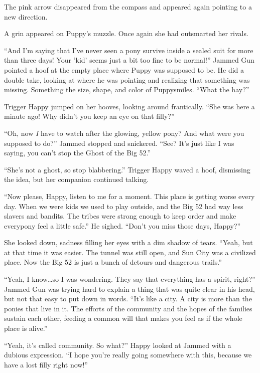 The pink arrow disappeared from the compass and appeared again pointing to a new direction.

A grin appeared on Puppy's muzzle. Once again she had outsmarted her rivals.


\horizonline


``And I'm saying that I've never seen a pony survive inside a sealed suit for more than three days! Your 'kid' seems just a bit too fine to be normal!'' Jammed Gun pointed a hoof at the empty place where Puppy was supposed to be. He did a double take, looking at where he was pointing and realizing that something was missing. Something the size, shape, and color of Puppysmiles. ``What the hay?''

Trigger Happy jumped on her hooves, looking around frantically. ``She was here a minute ago! Why didn't you keep an eye on that filly?''

``Oh, now \emph{I} have to watch after the glowing, yellow pony? And what were you supposed to do?'' Jammed stopped and snickered. ``See? It's just like I was saying, you can't stop the Ghost of the Big 52.''

``She's not a ghost, so stop blabbering.'' Trigger Happy waved a hoof, dismissing the idea, but her companion continued talking.

``Now please, Happy, listen to me for a moment. This place is getting worse every day. When we were kids we used to play outside, and the Big 52 had way less slavers and bandits. The tribes were strong enough to keep order and make everypony feel a little safe.'' He sighed. ``Don't you miss those days, Happy?''

She looked down, sadness filling her eyes with a dim shadow of tears. ``Yeah, but at that time it was easier. The tunnel was still open, and Sun City was a civilized place. Now the Big 52 is just a bunch of detours and dangerous trails.''

``Yeah, I know\dots so I was wondering. They say that everything has a spirit, right?'' Jammed Gun was trying hard to explain a thing that was quite clear in his head, but not that easy to put down in words. ``It's like a city. A city is more than the ponies that live in it. The efforts of the community and the hopes of the families sustain each other, feeding a common will that makes you feel as if the whole place is alive.''

``Yeah, it's called community. So what?'' Happy looked at Jammed with a dubious expression. ``I hope you're really going somewhere with this, because we have a lost filly right now!''

